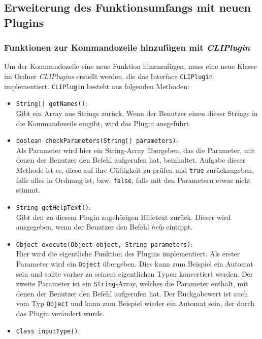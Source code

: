 \subsection{Erweiterung des Funktionsumfangs mit neuen Plugins}
\label{sec:3.3}
\subsubsection{Funktionen zur Kommandozeile hinzufügen mit \textit{CLIPlugin}}
\label{sec:3.3.1}
Um der Kommandozeile eine neue Funktion hinzuzufügen, muss eine neue Klasse im Ordner \textit{CLIPlugins} erstellt werden, die das Interface \lstinline[columns=fixed]{CLIPlugin} implementiert. \lstinline[columns=fixed]{CLIPlugin} besteht aus folgenden Methoden:
\begin{itemize}
	\item \lstinline[columns=fixed]{String[] getNames()}:\\
	Gibt ein Array aus Strings zurück. Wenn der Benutzer einen dieser Strings in die Kommandozeile eingibt, wird das Plugin ausgeführt.
	\item \lstinline[columns=fixed]{boolean checkParameters(String[] parameters)}:\\
	Als Parameter wird hier ein String-Array übergeben, das die Parameter, mit denen der Benutzer den Befehl aufgerufen hat, beinhaltet. Aufgabe dieser Methode ist es, diese auf ihre Gültigkeit zu prüfen und \lstinline[columns=fixed]{true} zurückzugeben, falls alles in Ordnung ist, bzw. \lstinline[columns=fixed]{false}, falls mit den Parametern etwas nicht stimmt.
	\item \lstinline[columns=fixed]{String getHelpText()}:\\
	Gibt den zu diesem Plugin zugehörigen Hilfetext zurück. Dieser wird ausgegeben, wenn der Benutzer den Befehl \textit{help} eintippt.
	\item \lstinline[columns=fixed]{Object execute(Object object, String parameters)}:\\
	Hier wird die eigentliche Funktion des Plugins implementiert. Als erster Parameter wird ein \lstinline[columns=fixed]{Object} übergeben. Dies kann zum Beispiel ein Automat sein und sollte vorher zu seinem eigentlichen Typen konvertiert werden. Der zweite Parameter ist ein \lstinline[columns=fixed]{String}-Array, welches die Parameter enthält, mit denen der Benutzer den Befehl aufgerufen hat. Der Rückgabewert ist auch vom Typ \lstinline[columns=fixed]{Object} und kann zum Beispiel wieder ein Automat sein, der durch das Plugin verändert wurde.
	\item \lstinline[columns=fixed]{Class inputType()}:\\

\end{itemize}

